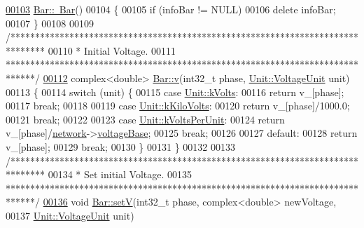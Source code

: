 \begin{DoxyCode}
\hypertarget{bar_8cpp_source_l00103}{}\hyperlink{group___models_ga9c7ebea0c189423591741ac438985316}{00103} \hyperlink{group___models_ga9c7ebea0c189423591741ac438985316}{Bar::~Bar}()
00104 \{
00105   \textcolor{keywordflow}{if} (infoBar != NULL)
00106     \textcolor{keyword}{delete} infoBar;
00107 \}
00108 
00109 \textcolor{comment}{/*******************************************************************************}
00110 \textcolor{comment}{ * Initial Voltage.}
00111 \textcolor{comment}{ ******************************************************************************/}
\hypertarget{bar_8cpp_source_l00112}{}\hyperlink{group___models_ga1e6f2daec86407118656d88170d1adc2}{00112} complex<double> \hyperlink{group___models_ga1e6f2daec86407118656d88170d1adc2}{Bar::v}(int32\_t phase, \hyperlink{class_unit_a55b07dfa9457e1eca2c7194fe0cfc3c1}{Unit::VoltageUnit} unit)
00113 \{
00114   \textcolor{keywordflow}{switch} (unit) \{
00115   \textcolor{keywordflow}{case} \hyperlink{class_unit_a55b07dfa9457e1eca2c7194fe0cfc3c1aa54b2473993a702a3923525765bd6e4c}{Unit::kVolts}:
00116     \textcolor{keywordflow}{return} v\_[phase];
00117     \textcolor{keywordflow}{break};
00118 
00119   \textcolor{keywordflow}{case} \hyperlink{class_unit_a55b07dfa9457e1eca2c7194fe0cfc3c1a35a201a658c2cd89766787c657e9a54d}{Unit::kKiloVolts}:
00120     \textcolor{keywordflow}{return} v\_[phase]/1000.0;
00121     \textcolor{keywordflow}{break};
00122 
00123   \textcolor{keywordflow}{case} \hyperlink{class_unit_a55b07dfa9457e1eca2c7194fe0cfc3c1ab44b1310b59fdcdc9df5bbea91da4206}{Unit::kVoltsPerUnit}:
00124     \textcolor{keywordflow}{return} v\_[phase]/\hyperlink{class_bar_a80025f13884750add58cc61b318357ff}{network}->\hyperlink{group___graphics_ga7c1e79d9ac69df9a69f24eaf092fd5e5}{voltageBase};
00125     \textcolor{keywordflow}{break};
00126 
00127   \textcolor{keywordflow}{default}:
00128     \textcolor{keywordflow}{return} v\_[phase];
00129     \textcolor{keywordflow}{break};
00130   \}
00131 \}
00132 
00133 \textcolor{comment}{/*******************************************************************************}
00134 \textcolor{comment}{ * Set initial Voltage.}
00135 \textcolor{comment}{ ******************************************************************************/}
\hypertarget{bar_8cpp_source_l00136}{}\hyperlink{group___models_ga9b6fbc92674bfcdc9d5090795ab335a6}{00136} \textcolor{keywordtype}{void} \hyperlink{group___models_ga9b6fbc92674bfcdc9d5090795ab335a6}{Bar::setV}(int32\_t phase, complex<double> newVoltage,
00137                \hyperlink{class_unit_a55b07dfa9457e1eca2c7194fe0cfc3c1}{Unit::VoltageUnit} unit)

\end{DoxyCode}
